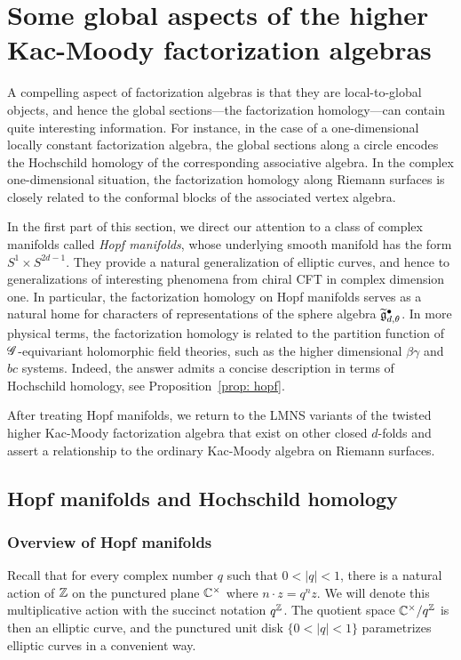  \section{Some global aspects of the higher Kac-Moody factorization algebras}

A compelling aspect of factorization algebras is that they are local-to-global objects,
and hence the global sections---the factorization homology---can contain quite interesting information.
For instance, in the case of a one-dimensional locally constant factorization algebra, the global sections along a circle encodes the Hochschild homology of the corresponding associative algebra. 
In the complex one-dimensional situation, the factorization homology along Riemann surfaces is closely related to the conformal blocks of the associated vertex algebra. 

In the first part of this section, we direct our attention to a class of complex manifolds called {\em Hopf manifolds},
whose underlying smooth manifold has the form $S^1 \times S^{2d-1}$.
They provide a natural generalization of elliptic curves, and hence to generalizations of interesting phenomena from chiral CFT in complex dimension one.
In particular, the factorization homology on Hopf manifolds serves as a natural home for characters of representations of the sphere algebra $\widetilde{\mathfrak g}_{d,\theta}^\bullet$.
In more physical terms, the factorization homology is related to the partition function of $\mathscr G$-equivariant holomorphic field theories, such as the higher dimensional $\beta\gamma$ and $bc$ systems.
Indeed, the answer admits a concise description in terms of Hochschild homology, see Proposition~\ref{prop: hopf}. 

After treating Hopf manifolds, we return to the LMNS variants of the twisted higher Kac-Moody factorization algebra that exist on other closed $d$-folds and assert a relationship to the ordinary Kac-Moody algebra on Riemann surfaces. 

\subsection{Hopf manifolds and Hochschild homology}

\subsubsection{Overview of Hopf manifolds}

Recall that for every complex number $q$ such that $0< |q| < 1$, 
there is a natural action of $\mathbb Z$ on the punctured plane $\mathbb C^\times$ where $n \cdot z = q^n z$.
We will denote this multiplicative action with the succinct notation $q^\mathbb Z$.
The quotient space $\mathbb C^\times/q^\mathbb Z$ is then an elliptic curve,
and the punctured unit disk $\{0< |q|<1\}$ parametrizes elliptic curves in a convenient way.


